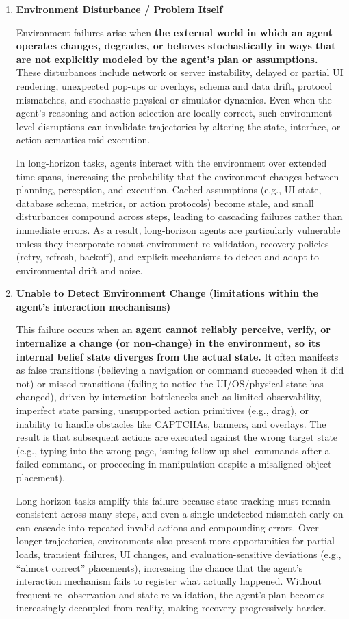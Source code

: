 \documentclass[11pt]{article}
\begin{document}
\begin{enumerate}
\item \textbf{Environment
Disturbance / Problem Itself}

Environment failures arise when \textbf{the external world in which an agent operates changes,
degrades, or behaves stochastically in ways that are not explicitly modeled by the agent’s
plan or assumptions.} These disturbances include network or server instability, delayed or
partial UI rendering, unexpected pop-ups or overlays, schema and data drift, protocol
mismatches, and stochastic physical or simulator dynamics. Even when the agent’s
reasoning and action selection are locally correct, such environment-level disruptions can
invalidate trajectories by altering the state, interface, or action semantics mid-execution.

In long-horizon tasks, agents interact with the environment over extended time spans,
increasing the probability that the environment changes between planning, perception, and
execution. Cached assumptions (e.g., UI state, database schema, metrics, or action protocols)
become stale, and small disturbances compound across steps, leading to cascading failures
rather than immediate errors. As a result, long-horizon agents are particularly vulnerable
unless they incorporate robust environment re-validation, recovery policies (retry, refresh,
backoff), and explicit mechanisms to detect and adapt to environmental drift and noise.

\item \textbf{Unable to Detect Environment Change (limitations within the agent’s interaction mechanisms)}

This failure occurs when an \textbf{agent cannot reliably perceive, verify, or internalize a change (or
non-change) in the environment, so its internal belief state diverges from the actual state.} It
often manifests as false transitions (believing a navigation or command succeeded when it
did not) or missed transitions (failing to notice the UI/OS/physical state has changed), driven
by interaction bottlenecks such as limited observability, imperfect state parsing, unsupported
action primitives (e.g., drag), or inability to handle obstacles like CAPTCHAs, banners, and
overlays. The result is that subsequent actions are executed against the wrong target state
(e.g., typing into the wrong page, issuing follow-up shell commands after a failed command,
or proceeding in manipulation despite a misaligned object placement).

Long-horizon tasks amplify this failure because state tracking must remain consistent across
many steps, and even a single undetected mismatch early on can cascade into repeated
invalid actions and compounding errors. Over longer trajectories, environments also present
more opportunities for partial loads, transient failures, UI changes, and evaluation-sensitive
deviations (e.g., “almost correct” placements), increasing the chance that the agent’s
interaction mechanism fails to register what actually happened. Without frequent re-
observation and state re-validation, the agent’s plan becomes increasingly decoupled from
reality, making recovery progressively harder.
\end{enumerate}
\end{document}
